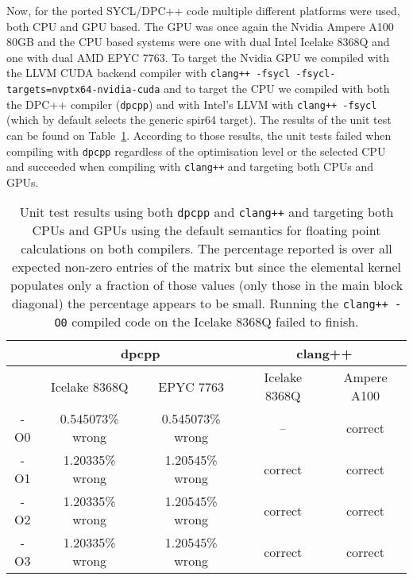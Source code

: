 \documentclass[../main]{subfiles}
\begin{document}
Now, for the ported SYCL/DPC++ code multiple different platforms were used, both CPU and GPU based.
The GPU was once again the Nvidia Ampere A100 80GB and the CPU based systems were one with dual Intel Icelake 8368Q and one with dual AMD EPYC 7763.
To target the Nvidia GPU we compiled with the LLVM CUDA backend compiler with \texttt{clang++ -fsycl -fsycl-targets=nvptx64-nvidia-cuda} and to target the CPU we compiled with both the DPC++ compiler (\texttt{dpcpp}) and with Intel's LLVM with \texttt{clang++ -fsycl} (which by default selects the generic spir64 target).
The results of the unit test can be found on Table~\ref{tab:correctness}.
According to those results, the unit tests failed when compiling with \texttt{dpcpp} regardless of the optimisation level or the selected CPU and succeeded when compiling with \texttt{clang++} and targeting both CPUs and GPUs.
\begin{center}
	\begin{table}
		\begin{tabular}{||c c c c c||}
			\hline
			    & \multicolumn{2}{c}{dpcpp} & \multicolumn{2}{c||}{clang++}                               \\ [0.5ex]
			\hline
			    & Icelake 8368Q             & EPYC 7763                     & Icelake 8368Q & Ampere A100 \\ [0.5ex]
			\hline\hline
			-O0 & 0.545073\% wrong          & 0.545073\% wrong              & --             & correct    \\ [0.3ex]
			\hline
			-O1 & 1.20335\% wrong           & 1.20545\% wrong               & correct       & correct     \\ [0.3ex]
			\hline
			-O2 & 1.20335\% wrong           & 1.20545\% wrong               & correct       & correct     \\ [0.3ex]
			\hline
			-O3 & 1.20335\% wrong           & 1.20545\% wrong               & correct       & correct     \\ [0.3ex]
			\hline
		\end{tabular}
		\caption{\label{tab:correctness} Unit test results using both \texttt{dpcpp} and \texttt{clang++} and targeting both CPUs and GPUs using the default semantics for floating point calculations on both compilers. The percentage reported is over all expected non-zero entries of the matrix but since the elemental kernel populates only a fraction of those values (only those in the main block diagonal) the percentage appears to be small. Running the \texttt{clang++ -O0} compiled code on the Icelake 8368Q failed to finish.}
	\end{table}
\end{center}
\end{document}
